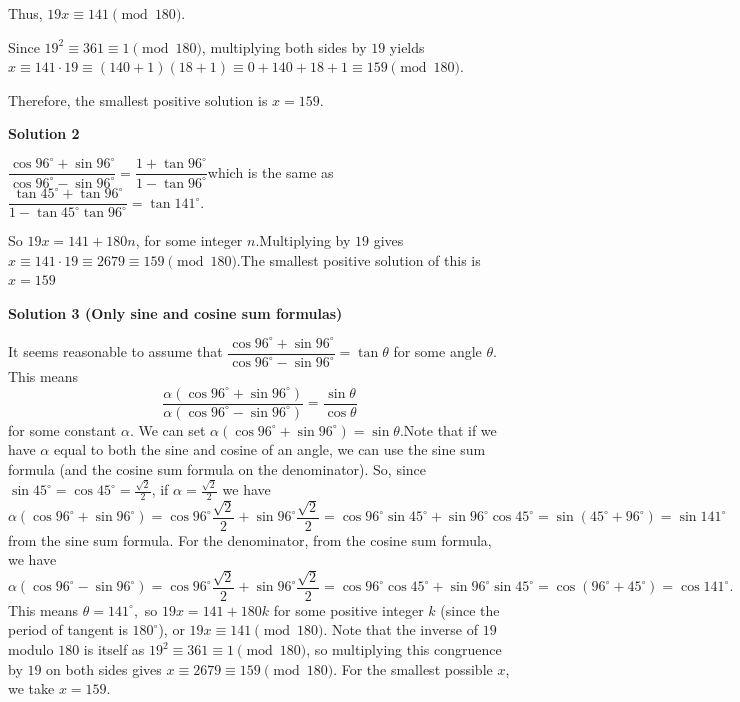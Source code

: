\begin{enumerate}
 Thus, $19x \equiv 141 \pmod{180}$. 

 Since $19^2 \equiv 361 \equiv 1 \pmod{180}$, multiplying both sides by $19$ yields $x \equiv 141 \cdot 19 \equiv (140+1)(18+1) \equiv 0+140+18+1 \equiv 159 \pmod{180}$. 

 Therefore, the smallest positive solution is $x = \boxed{159}$.

 



\textbf{Solution 2}

$\dfrac{\cos{96^{\circ}}+\sin{96^{\circ}}}{\cos{96^{\circ}}-\sin{96^{\circ}}} = \dfrac{1 + \tan{96^{\circ}}}{1-\tan{96^{\circ}}}$which is the same as $\dfrac{\tan{45^{\circ}} + \tan{96^{\circ}}}{1-\tan{45^{\circ}}\tan{96^{\circ}}} = \tan{141{^\circ}}$.

 So $19x = 141 +180n$, for some integer $n$.Multiplying by $19$ gives $x \equiv 141 \cdot 19 \equiv 2679 \equiv 159 \pmod{180}$.The smallest positive solution of this is $x = \boxed{159}$




\textbf{Solution 3 (Only sine and cosine sum formulas)}

It seems reasonable to assume that $\dfrac{\cos{96^{\circ}}+\sin{96^{\circ}}}{\cos{96^{\circ}}-\sin{96^{\circ}}} = \tan{\theta}$ for some angle $\theta$. This means 
 \[\dfrac{\alpha (\cos{96^{\circ}}+\sin{96^{\circ}})}{\alpha (\cos{96^{\circ}}-\sin{96^{\circ}})} = \frac{\sin{\theta}}{\cos{\theta}}\] for some constant $\alpha$. We can set $\alpha (\cos{96^{\circ}}+\sin{96^{\circ}}) = \sin{\theta}$.Note that if we have $\alpha$ equal to both the sine and cosine of an angle, we can use the sine sum formula (and the cosine sum formula on the denominator). So, since $\sin{45^{\circ}} = \cos{45^{\circ}} = \frac{\sqrt{2}}{2}$, if $\alpha = \frac{\sqrt{2}}{2}$ we have 
 \[\alpha (\cos{96^{\circ}} + \sin{96^{\circ}}) = \cos{96^{\circ}} \frac{\sqrt{2}}{2} + \sin{96^{\circ}} \frac{\sqrt{2}}{2} = \cos{96^{\circ}} \sin{45^{\circ}} + \sin{96^{\circ}} \cos{45^{\circ}} = \sin({45^{\circ} + 96^{\circ}}) = \sin{141^{\circ}}\]from the sine sum formula. For the denominator, from the cosine sum formula, we have 
 \[\alpha (\cos{96^{\circ}} - \sin{96^{\circ}}) = \cos{96^{\circ}} \frac{\sqrt{2}}{2} + \sin{96^{\circ}} \frac{\sqrt{2}}{2} = \cos{96^{\circ}} \cos{45^{\circ}} + \sin{96^{\circ}} \sin{45^{\circ}} = \cos({96^{\circ}  + 45^{\circ}}) = \cos{141^{\circ}}.\]This means $\theta = 141^{\circ},$ so $19x = 141 + 180k$ for some positive integer $k$ (since the period of tangent is $180^{\circ}$), or $19 x \equiv 141 \pmod{180}$. Note that the inverse of $19$ modulo $180$ is itself as $19^2 \equiv 361 \equiv 1 \pmod {180}$, so multiplying this congruence by $19$ on both sides gives $x \equiv 2679 \equiv 159 \pmod{180}.$ For the smallest possible $x$, we take $x = \boxed{159}.$





\end{enumerate}
